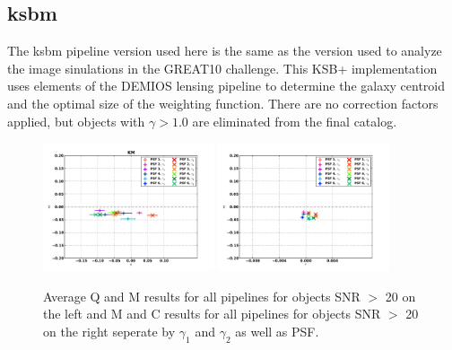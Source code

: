 \newpage 
\subsection{ksbm}
The ksbm pipeline version used here is the same as the version
used to analyze the image sinulations in the GREAT10 challenge. This
KSB+ implementation uses elements of the 
DEMIOS lensing pipeline to determine the galaxy centroid and the
optimal size of the weighting function. There are no correction
factors applied, but objects with $\gamma > 1.0 $ are eliminated from
the final catalog. \\

\begin{figure}
\centering
\includegraphics[width=0.45\textwidth]{fig/QMC_main_KM_f.pdf} 
\includegraphics[width=0.45\textwidth]{fig/MC_main_KM_f.pdf} 
\caption{Average Q and M results for all pipelines for objects 
SNR $>$ 20 on the left and M and C results for all pipelines for objects 
SNR $>$ 20 on the right seperate by $\gamma_{1} $ and $\gamma_{2} $ as
well as PSF.}
\label{fig:ksbm_qmc}
\end{figure}

